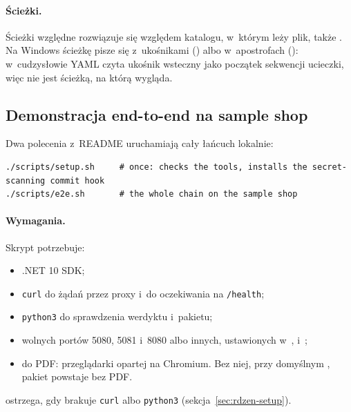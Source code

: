\paragraph{Ścieżki.} Ścieżki względne rozwiązuje się względem katalogu, w~którym leży plik,
także . Na Windows ścieżkę pisze się z~ukośnikami () albo w~apostrofach (): w~cudzysłowie YAML czyta ukośnik wsteczny jako
początek sekwencji ucieczki, więc  nie jest ścieżką, na którą wygląda.


\subsection{Demonstracja end-to-end na sample shop}\label{sec:cli-e2e}

Dwa polecenia z~README uruchamiają cały łańcuch lokalnie:

\begin{lstlisting}
./scripts/setup.sh     # once: checks the tools, installs the secret-scanning commit hook
./scripts/e2e.sh       # the whole chain on the sample shop
\end{lstlisting}

\paragraph{Wymagania.} Skrypt potrzebuje:
\begin{itemize}
  \item .NET 10 SDK;
  \item \texttt{curl} do żądań przez proxy i~do oczekiwania na \texttt{/health};
  \item \texttt{python3} do sprawdzenia werdyktu i~pakietu;
  \item wolnych portów 5080, 5081 i~8080 albo innych, ustawionych
        w~, 
        i~;
  \item do PDF: przeglądarki opartej na Chromium. Bez niej, przy domyślnym
        , pakiet powstaje bez PDF.
\end{itemize}
 ostrzega, gdy brakuje \texttt{curl} albo \texttt{python3}
(sekcja~\ref{sec:rdzen-setup}).

